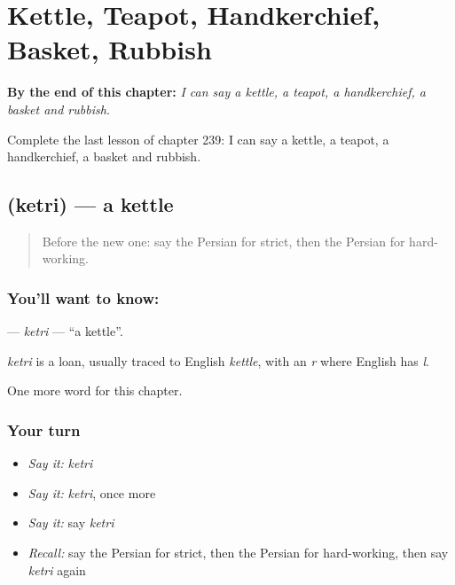 
\chapter{Kettle, Teapot, Handkerchief, Basket, Rubbish}
\label{ch:fa-kettle-teapot-handkerchief-basket-rubbish}

\begin{chapteropening}
\textbf{By the end of this chapter:} \emph{I can say a kettle, a teapot, a handkerchief, a basket and rubbish.}

Complete the last lesson of chapter 239: I can say a kettle, a teapot, a handkerchief, a basket and rubbish.
\end{chapteropening}

\section[\texorpdfstring{\fa{کتری} (ketri)}{کتری (ketri)}]{ (ketri) — a kettle}

\label{lesson:FA-C239-ketri}



\begin{quote}
Before the new one: say the Persian for strict, then the Persian for hard-working.
\end{quote}

\subsection*{You'll want to know: }
\textbf{} — \emph{ketri} — \textquotedblleft{}a kettle\textquotedblright{}.

\begin{cousinweb}
\emph{ketri} is a loan, usually traced to English \emph{kettle}, with an \emph{r} where English has \emph{l}.
\end{cousinweb}

\begin{grammarlens}[title={What you've built}]
One more word for this chapter.
\end{grammarlens}

\subsection*{Your turn}
\begin{itemize}
\raggedright
  \item \emph{Say it:} \emph{ketri}
  \item \emph{Say it:} \emph{ketri}, once more
  \item \emph{Say it:} say \emph{ketri}
  \item \emph{Recall:} say the Persian for strict, then the Persian for hard-working, then say \emph{ketri} again
\end{itemize}


